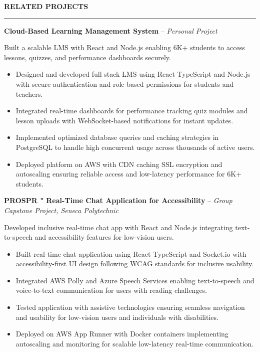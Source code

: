 \documentclass[10pt,letterpaper]{article}
\begin{document}
\vspace{6pt}

\textbf{RELATED PROJECTS}\\[-8pt]
\noindent\rule{\textwidth}{1pt}

\vspace{-2pt}

\textbf{Cloud-Based Learning Management System} -- \emph{Personal Project}

\vspace{-1pt}

Built a scalable LMS with React and Node.js enabling 6K+ students to access lessons, quizzes, and performance dashboards securely.
\vspace{-1pt}
\begin{itemize}
\item Designed and developed full stack LMS using React TypeScript and Node.js with secure authentication and role-based permissions for students and teachers.
\item Integrated real-time dashboards for performance tracking quiz modules and lesson uploads with WebSocket-based notifications for instant updates.
\item Implemented optimized database queries and caching strategies in PostgreSQL to handle high concurrent usage across thousands of active users.
\item Deployed platform on AWS with CDN caching SSL encryption and autoscaling ensuring reliable access and low-latency performance for 6K+ students.
\end{itemize}

\textbf{PROSPR " Real-Time Chat Application for Accessibility} -- \emph{Group Capstone Project, Seneca Polytechnic}

\vspace{-1pt}

Developed inclusive real-time chat app with React and Node.js integrating text-to-speech and accessibility features for low-vision users.
\vspace{-1pt}
\begin{itemize}
\item Built real-time chat application using React TypeScript and Socket.io with accessibility-first UI design following WCAG standards for inclusive usability.
\item Integrated AWS Polly and Azure Speech Services enabling text-to-speech and voice-to-text communication for users with reading challenges.
\item Tested application with assistive technologies ensuring seamless navigation and usability for low-vision users and individuals with disabilities.
\item Deployed on AWS App Runner with Docker containers implementing autoscaling and monitoring for scalable low-latency real-time communication.
\end{itemize}
\end{document}
